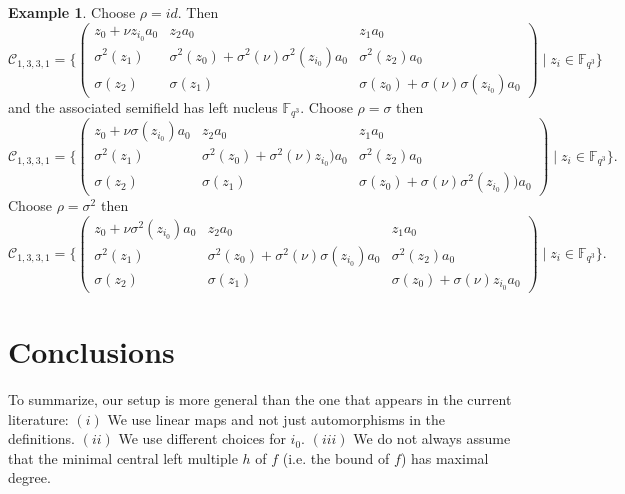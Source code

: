 \documentclass[12pt]{amsart}
\theoremstyle{plain}
\theoremstyle{definition}
\newtheorem{example}[theorem]{Example}
\numberwithin{equation}{section}
\numberwithin{figure}{section}
\begin{document}
\begin{example}
Choose $\rho=id$. Then
 $$\mathcal{C}_{1,3,3,1}= \Big\{
 \left( \begin{array}{ccc}
z_0+\nu z_{i_0}a_0&       z_2      a_0                                       &   z_1 a_0\\
\sigma^2(z_1)      &     \sigma^2(z_0)+ \sigma^2(\nu)\sigma^2(z_{i_0}) a_0  &   \sigma^2(z_2)a_0 \\
\sigma(z_2)        &      \sigma(z_1)                                         & \sigma(z_0)+ \sigma(\nu)\sigma( z_{i_0}) a_0
\end{array} \right)
\mid z_i\in \mathbb{F}_{q^3}
\Big\}
$$
and the associated semifield has left nucleus  $\mathbb{F}_{q^3}$.
Choose $\rho=\sigma$ then
 $$\mathcal{C}_{1,3,3,1}= \Big\{
 \left( \begin{array}{ccc}
z_0+\nu\sigma(z_{i_0})a_0&       z_2      a_0                                       &   z_1 a_0\\
\sigma^2(z_1)      &     \sigma^2(z_0)+ \sigma^2(\nu)z_{i_0}) a_0  &   \sigma^2(z_2)a_0 \\
\sigma(z_2)        &      \sigma(z_1)                                         & \sigma(z_0)+ \sigma(\nu)\sigma^2(z_{i_0})) a_0
\end{array} \right)
\mid z_i\in \mathbb{F}_{q^3}
\Big\}.
$$
Choose $\rho=\sigma^2$ then
$$\mathcal{C}_{1,3,3,1}= \Big\{
 \left( \begin{array}{ccc}
z_0+\nu \sigma^2(z_{i_0})a_0&       z_2      a_0                                       &   z_1 a_0\\
\sigma^2(z_1)      &     \sigma^2(z_0)+ \sigma^2(\nu)\sigma(z_{i_0}) a_0  &   \sigma^2(z_2)a_0 \\
\sigma(z_2)        &      \sigma(z_1)                                         & \sigma(z_0)+ \sigma(\nu)z_{i_0} a_0
\end{array} \right)
\mid z_i\in \mathbb{F}_{q^3}
\Big\}.
$$
\end{example}


\section{Conclusions}

To summarize, our setup is more general than  the one that appears  in the current  literature:
$(i)$
 We use linear  maps and not just automorphisms  in the definitions. $(ii)$ We use different choices for $i_0$. $(iii)$  We do not always assume that the minimal central left multiple $h$ of $f$ (i.e. the bound of $f$)
 has  maximal degree.
\end{document}
